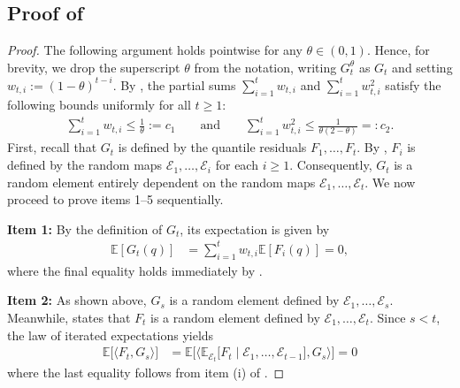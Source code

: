\documentclass[a4paper, 11pt]{article}
\newcommand{\E}{\mathbb E}
\newcommand{\T}{\mathcal E}
\theoremstyle{definition}
\begin{document}
\subsection{Proof of } \label{apx:proof_g_moment}

\begin{proof}
	The following argument holds pointwise for any $\theta \in (0, 1)$.
	Hence, for brevity, we drop the superscript $\theta$ from the notation, writing $G_t^\theta$ as $G_t$ and setting $w_{t,i} := (1 - \theta)^{t-i}$.
	By , the partial sums $\sum_{i=1}^{t} w_{t,i}$ and $\sum_{i=1}^{t} w_{t,i}^2$ satisfy the following bounds uniformly for all $t \ge 1$:
	\begin{align}
		\sum_{i=1}^{t} w_{t,i} \le \frac{1}{\theta} := c_1 \qquad \text{and} \qquad \sum_{i=1}^{t} w_{t,i}^2 \le \frac{1}{\theta (2 - \theta)} =: c_2 . \label{eq:w_bounds}
	\end{align}
    First, recall that $G_t$ is defined by the quantile residuals $F_1, \dots, F_t$.
    By , $F_i$ is defined by the random maps $\T_1, \dots, \T_i$ for each $i \ge 1$.
    Consequently, $G_t$ is a random element entirely dependent on the random maps $\T_1, \dots, \T_t$.
	We now proceed to prove items 1–5 sequentially.
    
    \vspace{5pt}
	\noindent
	\textbf{Item 1:}
    By the definition of $G_t$, its expectation is given by
    \begin{align}
		\E[ G_t(q) ] & = \sum_{i=1}^{t} w_{t,i} \E[ F_i(q) ] = 0 ,
	\end{align}
    where the final equality holds immediately by .
    
    \vspace{5pt}
	\noindent
	\textbf{Item 2:}
    As shown above, $G_s$ is a random element defined by $\T_1, \dots, \T_s$.
    Meanwhile,  states that $F_t$ is a random element defined by $\T_1, \dots, \T_t$.
    Since $s < t$, the law of iterated expectations yields
    \begin{align}
		\E\big[ \langle F_t, G_s \rangle \big] & = \E\Big[ \big\langle \E_{\T_t}\big[ F_t \mid \T_1, \dots, \T_{t-1} \big], G_s \big\rangle \Big] = 0
	\end{align}
    where the last equality follows from item (i) of .
    

\end{proof}
\end{document}
